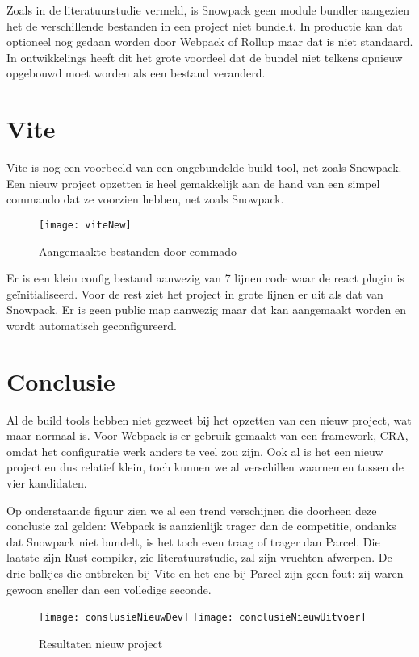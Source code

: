 Zoals in de literatuurstudie vermeld, is Snowpack geen module bundler aangezien het de verschillende bestanden in een project niet bundelt. In productie kan dat optioneel nog gedaan worden door Webpack of Rollup maar dat is niet standaard. In ontwikkelings heeft dit het grote voordeel dat de bundel niet telkens opnieuw opgebouwd moet worden als een bestand veranderd.

\section{Vite}
Vite is nog een voorbeeld van een ongebundelde build tool, net zoals Snowpack. Een nieuw project opzetten is heel gemakkelijk aan de hand van een simpel commando dat ze voorzien hebben, net zoals Snowpack.



\begin{figure}[h]
   \texttt{[image: viteNew]}
       \centering
       \caption[Aangemaakte bestanden door Vite commando]{Aangemaakte bestanden door commado}
   \end{figure}

Er is een klein config bestand aanwezig van 7 lijnen code waar de react plugin is geïnitialiseerd. Voor de rest ziet het project in grote lijnen er uit als dat van Snowpack. Er is geen public map aanwezig maar dat kan aangemaakt worden en wordt automatisch geconfigureerd.


\section{Conclusie}
Al de build tools hebben niet gezweet bij het opzetten van een nieuw project, wat maar normaal is. Voor Webpack is er gebruik gemaakt van een framework, CRA, omdat het configuratie werk anders te veel zou zijn. Ook al is het een nieuw project en dus relatief klein, toch kunnen we al verschillen waarnemen tussen de vier kandidaten.

Op onderstaande figuur zien we al een trend verschijnen die doorheen deze conclusie zal gelden: Webpack is aanzienlijk trager dan de competitie, ondanks dat Snowpack niet bundelt, is het toch even traag of trager dan Parcel. Die laatste zijn Rust compiler, zie literatuurstudie, zal zijn vruchten afwerpen. De drie balkjes die ontbreken bij Vite en het ene bij Parcel zijn geen fout: zij waren gewoon sneller dan een volledige seconde.

\begin{figure}[h]
   \texttt{[image: conslusieNieuwDev]}
       \centering
       \texttt{[image: conclusieNieuwUitvoer]}
       \centering
       \caption{Resultaten nieuw project}
   \end{figure}


